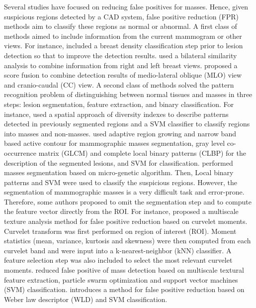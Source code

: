 \documentclass[review,12pt]{elsarticle}
\begin{document}
Several studies have focused on reducing false positives for masses. Hence, given suspicious regions detected by a CAD system, false positive reduction (FPR) methods aim to classify these regions as normal or abnormal.  A first class of methods aimed to include information from the current mammogram or other views. For instance, \cite{Vallez2014} included a breast density classification step prior to lesion detection so that to improve the detection results.
 \cite{Li2015} used a bilateral similarity analysis to combine information from right and left breast views. \cite{Tan2014} proposed a score fusion to combine detection results of medio-lateral oblique (MLO) view and cranio-caudal (CC) view.
  A second class of methods  solved the pattern recognition problem of distinguishing between normal tissues and masses in three steps: lesion segmentation, feature extraction, and binary classification.
For instance, \cite{Junior2013} used a spatial approach of diversity indexes to describe patterns detected in previously segmented regions and a SVM classifier to classify regions into masses and non-masses. \cite{Liu2015} used  adaptive region growing and narrow band based active contour  for mammographic masses segmentation,   gray level co-occurrence matrix (GLCM) and complete local binary patterns (CLBP) for the  description of the segmented lesions, and  SVM for classification.
\cite{Sampaio2015} performed masses segmentation based on micro-genetic algorithm. Then,  Local binary patterns and SVM were used to classify the suspicious regions.
However, the segmentation of mammographic masses is a very difficult task and error-prone. Therefore, some authors proposed to omit the segmentation step and to compute the feature vector directly from the ROI.  For instance, \cite{Dhahbi2015} proposed a multiscale texture analysis method for false positive reduction based on curvelet moments. Curvelet transform was first performed on region of interest (ROI). Moment statistics (mean, variance, kurtosis and skewness) were then computed from each curvelet band and were input into a k-nearest-neighbor (kNN) classifier. A feature selection step was also included to select the most relevant curvelet moments. \cite{Zyout2015} reduced false positive of mass detection based on multiscale textural feature extraction, particle swarm optimization and support vector machines (SVM) classification.  \cite{Hussain2014} introduces a method for false positive reduction based on Weber law descriptor (WLD) and SVM classification.
\end{document}
